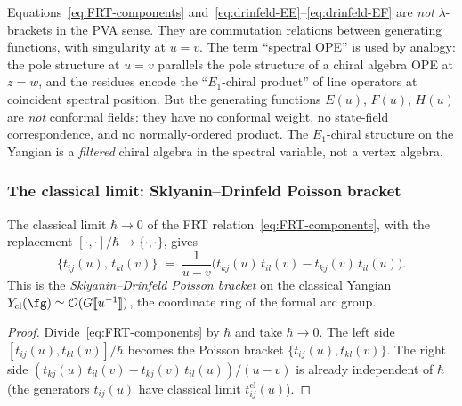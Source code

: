 \begin{remark}
\label{rem:spectral-OPE-nature}
Equations~\eqref{eq:FRT-components}
and~\eqref{eq:drinfeld-EE}--\eqref{eq:drinfeld-EF} are
\emph{not} $\lambda$-brackets in the PVA sense. They are
commutation relations between generating functions, with
singularity at $u = v$. The term ``spectral OPE'' is used
by analogy: the pole structure at $u = v$ parallels the pole
structure of a chiral algebra OPE at $z = w$, and the
residues encode the ``$E_1$-chiral product'' of line operators
at coincident spectral position. But the generating functions
$E(u)$, $F(u)$, $H(u)$ are \emph{not} conformal fields: they
have no conformal weight, no state-field correspondence, and
no normally-ordered product. The $E_1$-chiral structure on the
Yangian is a \emph{filtered} chiral algebra in the spectral
variable, not a vertex algebra.
\end{remark}

\subsubsection*{The classical limit: Sklyanin--Drinfeld Poisson
bracket}

\begin{proposition}
\label{prop:sklyanin-from-RTT}
The classical limit $\hbar \to 0$ of the FRT
relation~\eqref{eq:FRT-components}, with the replacement
$[\cdot, \cdot]/\hbar \to \{\cdot, \cdot\}$, gives
\begin{equation}\label{eq:sklyanin-bracket}
\{t_{ij}(u),\, t_{kl}(v)\}
\;=\;
\frac{1}{u - v}\bigl(
 t_{kj}(u)\,t_{il}(v) - t_{kj}(v)\,t_{il}(u)
\bigr).
\end{equation}
This is the \emph{Sklyanin--Drinfeld Poisson bracket} on the
classical Yangian $Y_{\mathrm{cl}}(\fg) \simeq
\mathcal{O}(G[\![u^{-1}]\!])$, the coordinate ring of the
formal arc group.
\end{proposition}

\begin{proof}
Divide~\eqref{eq:FRT-components} by $\hbar$ and take
$\hbar \to 0$. The left side
$[t_{ij}(u), t_{kl}(v)]/\hbar$ becomes the Poisson bracket
$\{t_{ij}(u), t_{kl}(v)\}$. The right side
$(t_{kj}(u)\,t_{il}(v) - t_{kj}(v)\,t_{il}(u))/(u-v)$
is already independent of $\hbar$ (the generators $t_{ij}(u)$
have classical limit $t_{ij}^{\mathrm{cl}}(u)$).
\end{proof}

